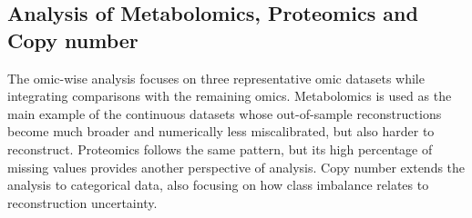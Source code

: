 \begin{table}
\centering
{}
\caption{Summary table of uncertainty metrics for Copy number, split by in-sample and out-of-sample subsets.}
\label{tab:uncertainty_summary_copy_number}
\end{table}

\subsection{Analysis of Metabolomics, Proteomics and Copy number}

The omic-wise analysis focuses on three representative omic datasets while integrating comparisons with the remaining omics. Metabolomics is used as the main example of the continuous datasets whose out-of-sample reconstructions become much broader and numerically less miscalibrated, but also harder to reconstruct. Proteomics follows the same pattern, but its high percentage of missing values provides another perspective of analysis. Copy number extends the analysis to categorical data, also focusing on how class imbalance relates to reconstruction uncertainty.

